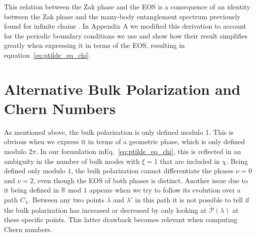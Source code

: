 \documentclass[twocolumn,amsmath,longbibliography,amssymb,superscriptaddress]{revtex4-1}
\begin{document}
This relation between the Zak phase and the EOS is a consequence of an identity between the Zak phase and the many-body entanglement spectrum previously found for infinite chains \cite{Zaletel2014}. In Appendix A we modified this derivation to account for the periodic boundary conditions we use and show how their result simplifies greatly when expressing it in terms of the EOS, resulting in equation~\eqref{eq:ptilde_eq_chi}.





\section{Alternative Bulk Polarization and Chern Numbers}

As mentioned above, the bulk polarization is only defined modulo 1. This is obvious when we express it in terms of a geometric phase, which is only defined modulo $2\pi$. In our formulation inEq.~\eqref{eq:ptilde_eq_chi}, this is reflected in an ambiguity in the number of bulk modes with $\xi = 1$ that are included in $\chi$. Being defined only modulo $1$, the bulk polarization cannot differentiate the phases $\nu=0$ and $\nu=2$, even though the EOS of both phases is distinct. Another issue due to it being defined in $\mathbb{R}$ mod $1$ appears when we try to follow its evolution over a path $C_\lambda$. Between any two points $\lambda$ and $\lambda'$ in this path it is not possible to tell if the bulk polarization has increased or decreased by only looking at $\tilde{\mathcal{P}}(\lambda)$ at these specific points.
 This latter drawback becomes relevant when computing Chern numbers.
\end{document}
